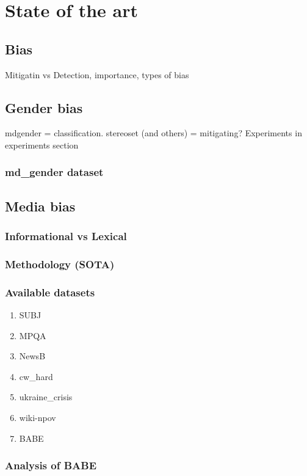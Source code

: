 \chapter{State of the art}

\section{Bias}
Mitigatin vs Detection, importance, types of bias
\section{Gender bias}
mdgender = classification. stereoset (and others) = mitigating?
Experiments in experiments section
\subsection{md\_gender dataset}
\section{Media bias}
\subsection{Informational vs Lexical}
\subsection{Methodology (SOTA)}
\subsection{Available datasets}



\begin{enumerate}
    \item SUBJ
    \item MPQA
    \item NewsB
    \item cw\_hard
    \item ukraine\_crisis
    \item wiki-npov \label{wiki}
    \item BABE
\end{enumerate}
\subsection{Analysis of BABE}